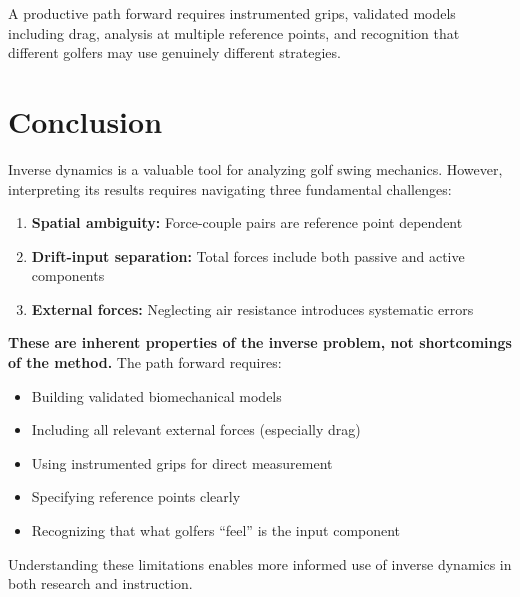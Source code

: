 \documentclass[11pt,a4paper]{article}
\theoremstyle{definition}
\theoremstyle{plain}
\begin{document}
A productive path forward requires instrumented grips, validated models including drag, analysis at multiple reference points, and recognition that different golfers may use genuinely different strategies.

\section{Conclusion}

Inverse dynamics is a valuable tool for analyzing golf swing mechanics. However, interpreting its results requires navigating three fundamental challenges:

\begin{enumerate}
    \item \textbf{Spatial ambiguity:} Force-couple pairs are reference point dependent
    \item \textbf{Drift-input separation:} Total forces include both passive and active components
    \item \textbf{External forces:} Neglecting air resistance introduces systematic errors
\end{enumerate}

\textbf{These are inherent properties of the inverse problem, not shortcomings of the method.} The path forward requires:

\begin{itemize}
    \item Building validated biomechanical models
    \item Including all relevant external forces (especially drag)
    \item Using instrumented grips for direct measurement
    \item Specifying reference points clearly
    \item Recognizing that what golfers ``feel'' is the input component
\end{itemize}

Understanding these limitations enables more informed use of inverse dynamics in both research and instruction.
\end{document}
